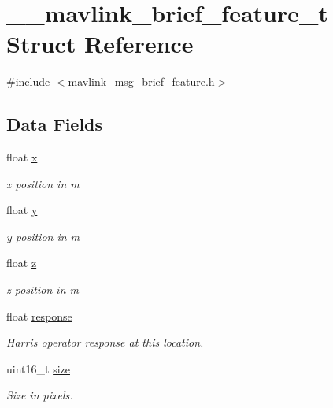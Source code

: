 \hypertarget{struct____mavlink__brief__feature__t}{\section{\+\_\+\+\_\+mavlink\+\_\+brief\+\_\+feature\+\_\+t Struct Reference}
\label{struct____mavlink__brief__feature__t}
}


{\ttfamily \#include $<$mavlink\+\_\+msg\+\_\+brief\+\_\+feature.\+h$>$}

\subsection*{Data Fields}
\begin{DoxyCompactItemize}
\item 
float \hyperlink{struct____mavlink__brief__feature__t_a3578814e1aaef42453c7be4812440040}{x}
\begin{DoxyCompactList}\small\item\em x position in m \end{DoxyCompactList}\item 
float \hyperlink{struct____mavlink__brief__feature__t_a1c888f447b41c0762bd985689228c060}{y}
\begin{DoxyCompactList}\small\item\em y position in m \end{DoxyCompactList}\item 
float \hyperlink{struct____mavlink__brief__feature__t_ab1c13951fa98c28e8abacf90c2be0af5}{z}
\begin{DoxyCompactList}\small\item\em z position in m \end{DoxyCompactList}\item 
float \hyperlink{struct____mavlink__brief__feature__t_adbd04463451af98733eff275a30c2869}{response}
\begin{DoxyCompactList}\small\item\em Harris operator response at this location. \end{DoxyCompactList}\item 
uint16\+\_\+t \hyperlink{struct____mavlink__brief__feature__t_ae5a40ae07cd595f22abed40eefa24be1}{size}
\begin{DoxyCompactList}\small\item\em Size in pixels. \end{DoxyCompactList}\item 

\end{DoxyCompactItemize}
